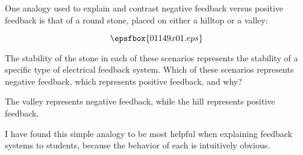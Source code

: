 

One analogy used to explain and contrast negative feedback versus positive feedback is that of a round stone, placed on either a hilltop or a valley:

$$\epsfbox{01149x01.eps}$$

The stability of the stone in each of these scenarios represents the stability of a specific type of electrical feedback system.  Which of these scenarios represents negative feedback, which represents positive feedback, and why?







The valley represents negative feedback, while the hill represents positive feedback.







I have found this simple analogy to be most helpful when explaining feedback systems to students, because the behavior of each is intuitively obvious.





